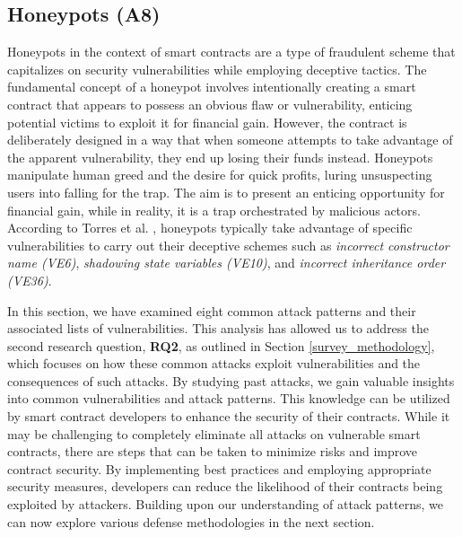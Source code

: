 \documentclass[manuscript,screen]{acmart}
\begin{document}
\subsection{Honeypots (A8)}
Honeypots in the context of smart contracts are a type of fraudulent scheme that capitalizes on security vulnerabilities while employing deceptive tactics. The fundamental concept of a honeypot involves intentionally creating a smart contract that appears to possess an obvious flaw or vulnerability, enticing potential victims to exploit it for financial gain. However, the contract is deliberately designed in a way that when someone attempts to take advantage of the apparent vulnerability, they end up losing their funds instead. Honeypots manipulate human greed and the desire for quick profits, luring unsuspecting users into falling for the trap. The aim is to present an enticing opportunity for financial gain, while in reality, it is a trap orchestrated by malicious actors. 
According to Torres et al. \cite{TorresSS19}, honeypots typically take advantage of specific vulnerabilities to carry out their deceptive schemes such as \textit{incorrect constructor name (VE6)}, \textit{shadowing state variables (VE10)}, and \textit{incorrect inheritance order (VE36)}.


In this section, we have examined eight common attack patterns and their associated lists of vulnerabilities. This analysis has allowed us to address the second research question, \textbf{RQ2}, as outlined in Section \ref{survey_methodology}, which focuses on how these common attacks exploit vulnerabilities and the consequences of such attacks. 
By studying past attacks, we gain valuable insights into common vulnerabilities and attack patterns. This knowledge can be utilized by smart contract developers to enhance the security of their contracts. While it may be challenging to completely eliminate all attacks on vulnerable smart contracts, there are steps that can be taken to minimize risks and improve contract security. By implementing best practices and employing appropriate security measures, developers can reduce the likelihood of their contracts being exploited by attackers. Building upon our understanding of attack patterns, we can now explore various defense methodologies in the next section.
\end{document}
